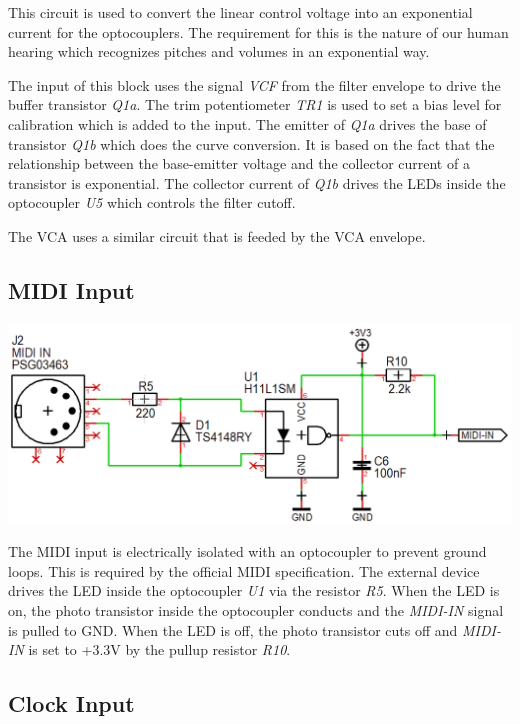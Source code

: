 \documentclass{scrartcl}
\begin{document}
This circuit is used to convert the linear control voltage into an exponential current for the optocouplers. The requirement for this is the nature of our human hearing which recognizes pitches and volumes in an exponential way.

The input of this block uses the signal \emph{VCF} from the filter envelope to drive the buffer transistor \emph{Q1a}. The trim potentiometer \emph{TR1} is used to set a bias level for calibration which is added to the input. The emitter of \emph{Q1a} drives the base of transistor \emph{Q1b} which does the curve conversion. It is based on the fact that the relationship between the base-emitter voltage and the collector current of a transistor is exponential. The collector current of \emph{Q1b} drives the LEDs inside the optocoupler \emph{U5} which controls the filter cutoff.

The VCA uses a similar circuit that is feeded by the VCA envelope.

\subsection{MIDI Input}

\begin{center}
    \includegraphics[scale=0.40]{assets/schema-midi.png}
\end{center}

The MIDI input is electrically isolated with an optocoupler to prevent ground loops. This is required by the official MIDI specification. The external device drives the LED inside the optocoupler \emph{U1} via the resistor \emph{R5}. When the LED is on, the photo transistor inside the optocoupler conducts and the \emph{MIDI-IN} signal is pulled to GND. When the LED is off, the photo transistor cuts off and \emph{MIDI-IN} is set to +3.3V by the pullup resistor \emph{R10}.

\subsection{Clock Input}
\end{document}
